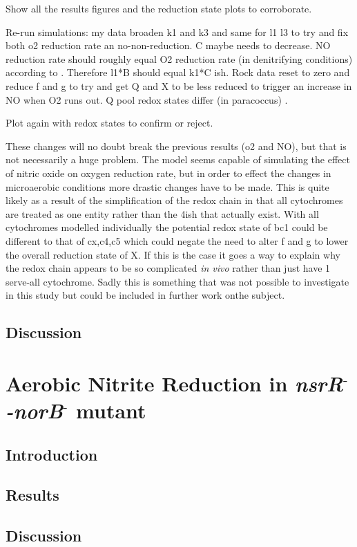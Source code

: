 Show all the results figures and the reduction state plots to corroborate.

Re-run simulations: my data broaden k1 and k3 and same for l1 l3 to try and fix both o2 reduction rate an no-non-reduction. C maybe needs to decrease. NO reduction rate should roughly equal O2 reduction rate (in denitrifying conditions) according to \citet{Rock2005}. Therefore l1*B should equal k1*C ish.
Rock data reset to zero and reduce f and g to try and get Q and X to be less reduced to trigger an increase in NO when O2 runs out. Q pool redox states differ (in paracoccus) \cite{Otten1999}.

Plot again with redox states to confirm or reject.

These changes will no doubt break the previous results (o2 and NO), but that is not necessarily a huge problem. The model seems capable of simulating the effect of nitric oxide on oxygen reduction rate, but in order to effect the changes in microaerobic conditions more drastic changes have to be made. This is quite likely as a result of the simplification of the redox chain in that all cytochromes are treated as one entity rather than the 4ish that actually exist. With all cytochromes modelled individually the potential redox state of bc1 could be different to that of cx,c4,c5 which could negate the need to alter f and g to lower the overall reduction state of X. If this is the case it goes a way to explain why the redox chain appears to be so complicated \textit{in vivo} rather than just have 1 serve-all cytochrome. Sadly this is something that was not possible to investigate in this study but could be included in further work onthe subject.

\subsection{Discussion}
\section{\texorpdfstring{Aerobic Nitrite Reduction in \textit{nsrR$^\textrm{-}$-norB$^\textrm{-}$} mutant}{Aerobic Nitrite Reduction in nsrR- - norB- mutant}}
\subsection{Introduction}
\subsection{Results}
\subsection{Discussion}